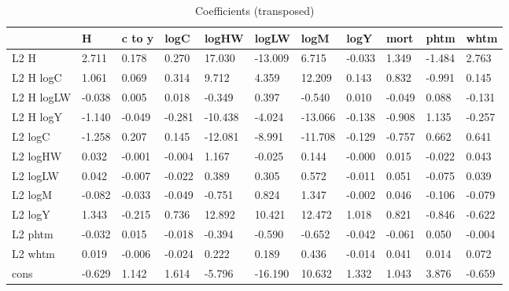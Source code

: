 \begin{table}[htbp]
\caption{\label{clabel} Coefficients (transposed)}\centering\medskip
\begin{tabular}{lllllllllll} \hline \hline
 & H  & c to y  & logC  & logHW  & logLW  & logM  & logY  & mort  & phtm  & whtm  \\  \hline 
L2 H &     2.711 &     0.178 &     0.270 &    17.030 &   -13.009 &     6.715 &    -0.033 &     1.349 &    -1.484 &     2.763 \\  
L2 H logC &     1.061 &     0.069 &     0.314 &     9.712 &     4.359 &    12.209 &     0.143 &     0.832 &    -0.991 &     0.145 \\  
L2 H logLW &    -0.038 &     0.005 &     0.018 &    -0.349 &     0.397 &    -0.540 &     0.010 &    -0.049 &     0.088 &    -0.131 \\  
L2 H logY &    -1.140 &    -0.049 &    -0.281 &   -10.438 &    -4.024 &   -13.066 &    -0.138 &    -0.908 &     1.135 &    -0.257 \\  
L2 logC &    -1.258 &     0.207 &     0.145 &   -12.081 &    -8.991 &   -11.708 &    -0.129 &    -0.757 &     0.662 &     0.641 \\  
L2 logHW &     0.032 &    -0.001 &    -0.004 &     1.167 &    -0.025 &     0.144 &    -0.000 &     0.015 &    -0.022 &     0.043 \\  
L2 logLW &     0.042 &    -0.007 &    -0.022 &     0.389 &     0.305 &     0.572 &    -0.011 &     0.051 &    -0.075 &     0.039 \\  
L2 logM &    -0.082 &    -0.033 &    -0.049 &    -0.751 &     0.824 &     1.347 &    -0.002 &     0.046 &    -0.106 &    -0.079 \\  
L2 logY &     1.343 &    -0.215 &     0.736 &    12.892 &    10.421 &    12.472 &     1.018 &     0.821 &    -0.846 &    -0.622 \\  
L2 phtm &    -0.032 &     0.015 &    -0.018 &    -0.394 &    -0.590 &    -0.652 &    -0.042 &    -0.061 &     0.050 &    -0.004 \\  
L2 whtm &     0.019 &    -0.006 &    -0.024 &     0.222 &     0.189 &     0.436 &    -0.014 &     0.041 &     0.014 &     0.072 \\  
cons &    -0.629 &     1.142 &     1.614 &    -5.796 &   -16.190 &    10.632 &     1.332 &     1.043 &     3.876 &    -0.659 \\  

\end{tabular}
\end{table}
